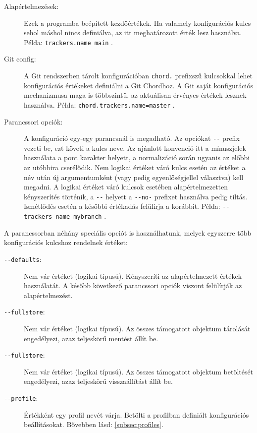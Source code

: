 \documentclass[
]{elteikthesis}[2025/03/25]
\begin{document}
\begin{description}
    \item[Alapértelmezések:]
        Ezek a programba beépített kezdőértékek.
        Ha valamely konfigurációs kulcs sehol máshol nincs definiálva, az itt meghatározott érték lesz használva.
        Példa: \verb|trackers.name main| .
    \item[Git config:]
        A Git rendszerben tárolt konfigurációban \verb|chord.| prefixszű kulcsokkal lehet konfigurációs értékeket definiálni a Git Chordhoz.
        A Git saját konfigurációs mechanizmusa maga is többszintű,
        az aktuálisan érvényes értékek lesznek használva.
        Példa: \verb|chord.trackers.name=master| .
    \item[Parancssori opciók:]
        A konfiguráció egy-egy parancsnál is megadható.
        Az opciókat \verb|--| prefix vezeti be, ezt követi a kulcs neve.
        Az ajánlott konvenció itt a mínuszjelek használata a pont karakter helyett,
        a normalizáció során ugyanis az előbbi az utóbbira cserélődik.
        Nem logikai értéket váró kulcs esetén az értéket a név után új argumentumként (vagy pedig egyenlőségjellel választva) kell megadni.
        A logikai értéket váró kulcsok esetében alapértelmezetten kényszerítés történik,
        a \verb|--| helyett a \verb|--no-| prefixet használva pedig tiltás.
        Ismétlődés esetén a későbbi értékadás felülírja a korábbit.
        Példa: \verb|--trackers-name mybranch| .
\end{description}

A parancssorban néhány speciális opciót is használhatunk, melyek egyszerre több konfigurációs kulcshoz rendelnek értéket:

\begin{description}
    \item[\texttt{{-}{-}defaults}:]
        Nem vár értéket (logikai típusú).
        Kényszeríti az alapértelmezett értékek használatát.
        A később következő parancssori opciók viszont felülírják az alapértelmezést.
    \item[\texttt{{-}{-}fullstore}:]
        Nem vár értéket (logikai típusú).
        Az összes támogatott objektum tárolását engedélyezi, azaz teljeskörű mentést állít be.
    \item[\texttt{{-}{-}fullstore}:]
        Nem vár értéket (logikai típusú).
        Az összes támogatott objektum betöltését engedélyezi, azaz teljeskörű visszaállítást állít be.
    \item[\texttt{{-}{-}profile}:]
        Értékként egy profil nevét várja.
        Betölti a profilban definiált konfigurációs beállításokat.
        Bővebben lásd: \ref{subsec:profiles}.
\end{description}
\end{document}
